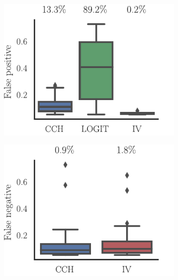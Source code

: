 \documentclass[11pt]{article}
\begin{document}
\begin{figure}
\makeatletter
\renewcommand\p@subfigure{}
\makeatother
\begin{subfigure}{0.485\textwidth} \includegraphics[scale=1]{false_positive}
\caption{} \label{fig:network-class:1}
\end{subfigure}\hfill
\begin{subfigure}{0.485\textwidth} \includegraphics[scale=1]{false_negative}
\caption{} \label{fig:network-class:2}
\end{subfigure}
% 
% 


\end{figure}
\end{document}
